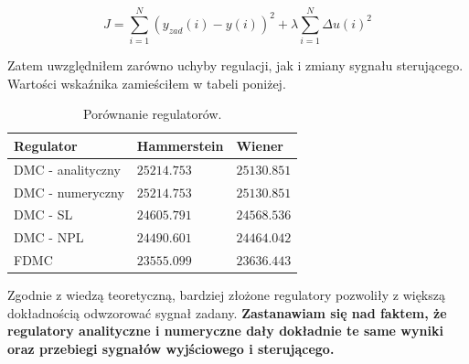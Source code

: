 \begin{equation}
J = \sum_{i=1}^N (y_{zad}(i) - y(i))^2 + \lambda \sum_{i=1}^N \Delta u(i)^2
\end{equation}

Zatem uwzględniłem zarówno uchyby regulacji, jak i zmiany sygnału sterującego. Wartości wskaźnika zamieściłem w tabeli poniżej.

\begin{table}[h!]
\centering
\begin{tabular}{|>{\raggedright\arraybackslash}p{4cm}|>{\centering\arraybackslash}p{4cm}|>{\centering\arraybackslash}p{4cm}|} 
\hline
Regulator & Hammerstein & Wiener \\ \hline
DMC - analityczny & $25214.753$ & $25130.851$ \\ \hline 
DMC - numeryczny & $25214.753$ & $25130.851$ \\ \hline 
DMC - SL & $24605.791$ & $24568.536 $ \\ \hline 
DMC - NPL & $24490.601$ & $24464.042$ \\ \hline 
FDMC & $23555.099$ & $23636.443$ \\ \hline 
\end{tabular}
\caption{Porównanie regulatorów.}
\end{table}

Zgodnie z wiedzą teoretyczną, bardziej złożone regulatory pozwoliły z większą dokładnością odwzorować sygnał zadany. \textbf{Zastanawiam się nad faktem, że regulatory analityczne i numeryczne dały dokładnie te same wyniki oraz przebiegi sygnałów wyjściowego i sterującego.}
